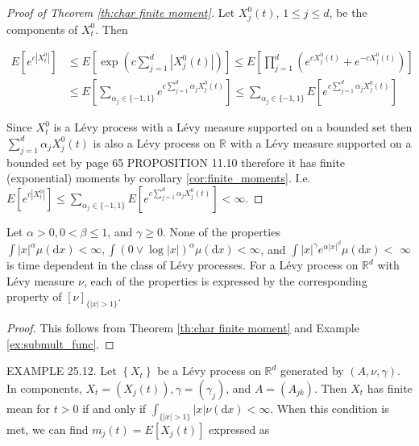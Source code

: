 \documentclass[a4paper,11pt]{article}
\begin{document}
\begin{proof}[Proof of Theorem \ref{th:char finite moment}]
    Let $X_{j}^{0}(t)$, $1 \leq j \leq d$, be the components of $X_{t}^{0}$. Then

    \begin{align}
        E\left[e^{c\left|X_{t}^{0}\right|}\right] & \leq E\left[\exp \left(c \sum_{j=1}^{d}\left|X_{j}^{0}(t)\right|\right)\right] \leq E\left[\prod_{j=1}^{d}\left(e^{c X_{j}^{0}(t)}+e^{-c X_{j}^{0}(t)}\right)\right] \\
                                                  &
        \le  E \left[ \sum_{\alpha_{j} \in \{-1,1\}} e^{c \sum_{ j=1} ^{d} \alpha_{j} X^{0}_{j}(t)} \right]
        \le  \sum_{\alpha_{j} \in \{-1,1\}} E \left[e^{c \sum_{ j=1} ^{d} \alpha_{j} X^{0}_{j}(t)} \right]
    \end{align}

    Since $X^{0}_{t}$ is a Lévy process with a Lévy measure supported on a bounded set
    then $\sum_{j=1}^{d} \alpha_{j} X^{0}_{j}(t)$ is also a Lévy process on $\mathbb{R}$ with a Lévy measure supported on a bounded set by \cite{sato_levy_2013} page 65 PROPOSITION 11.10
    therefore it has finite (exponential) moments by corollary \ref{cor:finite_moments}. I.e. $E\left[e^{c\left|X_{t}^{0}\right|}\right] \le \sum_{\alpha_{j} \in \{-1,1\}} E \left[e^{c \sum_{ j=1} ^{d} \alpha_{j} X^{0}_{j}(t)} \right] <  \infty$.
\end{proof}

\begin{corollary}
    Let $\alpha>0,0<\beta \leq 1$, and $\gamma \geq 0$. None of the properties
    $\int|x|^{\alpha} \mu(\mathrm{d} x)<\infty, \int(0 \vee \log |x|)^{\alpha} \mu(\mathrm{d} x)<\infty$, and
    $\int|x|^{\gamma} e^{\alpha|x|^{\beta}} \mu(\mathrm{d} x)<$ $\infty$ is time dependent in the class
    of Lévy processes. For a Lévy process on $\mathbb{R}^{d}$ with Lévy measure $\nu$, each of the properties
    is expressed by the corresponding property of $[\nu]_{\{|x|>1\}}$.
\end{corollary}

\begin{proof}
    This follows from Theorem \ref{th:char finite moment} and Example \ref{ex:submult_func}.
\end{proof}


EXAMPLE 25.12. Let $\left\{X_{t}\right\}$ be a Lévy process on $\mathbb{R}^{d}$ generated
by $(A, \nu, \gamma )$. In components, $X_{t}=\left(X_{j}(t)\right), \gamma=\left(\gamma_{j}\right)$,
and $A=\left(A_{j k}\right)$. Then $X_{t}$ has finite mean for $t>0$
if and only if $\int_{\{|x| >1\}} |x| \nu(\mathrm{d} x)<\infty$.
When this condition is met, we can find $m_{j}(t)=E\left[X_{j}(t)\right]$ expressed as
\end{document}
